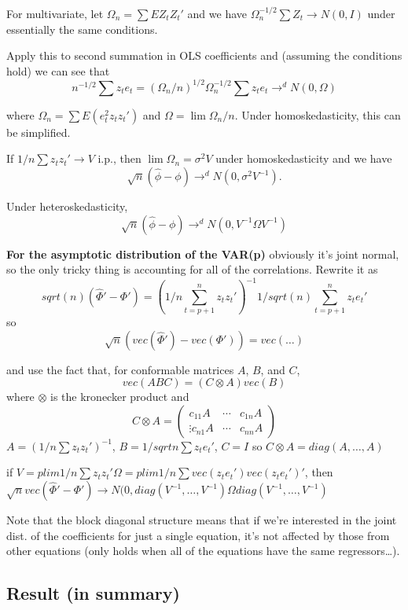 For multivariate, let $\Omega_n = \sum E Z_t Z_t'$ and we have $\Omega_n^{-1/2} \sum
Z_t \to N(0, I)$ under essentially the same conditions.

Apply this to second summation in OLS coefficients and (assuming the
conditions hold) we can see that
\[n^{-1/2} \sum z_t e_t = ( \Omega_n / n )^{1/2} \Omega_n^{-1/2} \sum z_t e_t
\to^d N(0,\Omega) \]

where $\Omega_n = \sum E( e_t^2 z_t z_t' )$ and $\Omega = \lim \Omega_n / n$. Under
homoskedasticity, this can be simplified.

If $1/n \sum z_t z_t' \to V$ i.p., then $\lim \Omega_n = \sigma^2 V$ under
homoskedasticity and we have
\[\sqrt{n} ( \hat \phi - \phi ) \to^d N( 0, \sigma^2 V^{-1} ).\]

Under heteroskedasticity,
\[\sqrt{n} (\hat \phi - \phi ) \to^d N( 0, V^{-1} \Omega V^{-1} )\]

\textbf{For the asymptotic distribution of the VAR(p)} obviously it's
joint normal, so the only tricky thing is accounting for all of the
correlations. Rewrite it as
\[
sqrt(n) (\hat \Phi' - \Phi')
= (1/n \sum_{t=p+1}^n z_t z_t')^{-1} 1/sqrt(n) \sum_{t=p+1}^n z_t e_t'
\]
so
\[\sqrt{n} ( vec(\hat \Phi' ) - vec( \Phi' ) ) = vec( \dots )\]

and use the fact that, for conformable matrices $A$, $B$, and $C$,
\[vec( A B C ) = ( C \otimes A ) vec( B )\]
where $\otimes$ is the kronecker product and
\[
C \otimes A =
\begin{pmatrix}
  c_{11}A & \cdots & c_{1n}A \\
  \vdots
  c_{n1}A & \cdots & c_{nn}A
\end{pmatrix}
\]
$A = ( 1/n \sum z_t z_t' )^{-1}$, $B = 1/sqrt{n} \sum z_t e_t'$, $C = I$ so
$C \otimes A = diag( A,\dots, A )$

if $V = plim 1/n \sum z_t z_t' \Omega = plim 1/n \sum vec( z_t e_t' ) vec( z_t
e_t' )'$, then $\sqrt{n} vec(\hat \Phi' - \Phi' ) \to N( 0, diag(
V^{-1},\dots, V^{-1} ) \Omega diag(V^{-1},\dots,V^{-1} )$

Note that the block diagonal structure means that if we're interested
in the joint dist. of the coefficients for just a single equation,
it's not affected by those from other equations (only holds when all
of the equations have the same regressors\dots).

\subsection{Result (in summary)}

